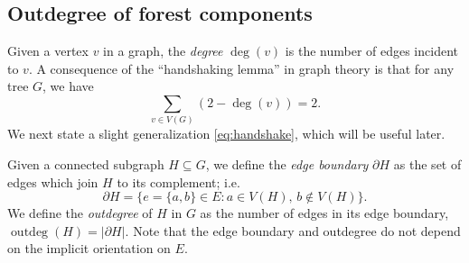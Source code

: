 \documentclass[12pt]{amsart}
\theoremstyle{definition}
\DeclareMathOperator{\outdeg}{outdeg}
\begin{document}
\subsection{Outdegree of forest components}
\label{sec:outdegree}

Given a vertex $v$ in a graph, the {\em degree} $\deg(v)$ is the number of edges incident to $v$.
A consequence of the ``handshaking lemma'' in graph theory is that for any tree $G$, we have
\begin{equation}
\label{eq:handshake}
	\sum_{v \in V(G)} (2 - \deg(v)) = 2.
\end{equation}
We next state a slight generalization \eqref{eq:handshake}, which will be useful later.

Given a connected subgraph $H \subseteq G$,
we define the {\em edge boundary} $\partial H$ as the set of edges which join $H$ to its complement; i.e.
\begin{equation}
	\partial H = \{ e = \{a,b\} \in E \colon a \in V(H),\, b \not\in V(H)\}.
\end{equation}
We define the {\em outdegree} of $H$ in $G$ as the number of edges in its edge boundary, $\outdeg(H) = |\partial H|$. 
Note that the edge boundary and outdegree do not depend on the implicit orientation on $E$.
\end{document}
